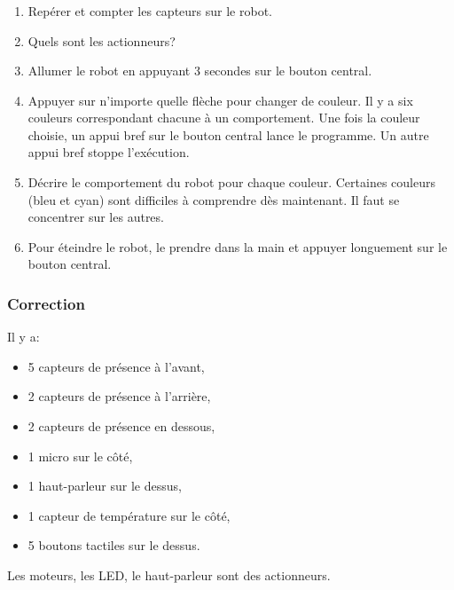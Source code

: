 \documentclass[svgnames,11pt]{beamer}
\begin{document}
\begin{frame}
    \frametitle{}

\begin{activite}
\begin{enumerate}
    \item Repérer et compter les capteurs sur le robot.
    \item Quels sont les actionneurs?
    \item Allumer le robot en appuyant 3 secondes sur le bouton central.
    \item Appuyer sur n'importe quelle flèche pour changer de couleur. Il y a six couleurs correspondant chacune à un comportement. Une fois la couleur choisie, un appui bref sur le bouton central lance le programme. Un autre appui bref stoppe l'exécution.
    \item Décrire le comportement du robot pour chaque couleur. Certaines couleurs (bleu et cyan) sont difficiles à comprendre dès maintenant. Il faut se concentrer sur les autres.
    \item Pour éteindre le robot, le prendre dans la main et appuyer longuement sur le bouton central.
\end{enumerate}
\end{activite}

\end{frame}
\begin{frame}
    \frametitle{Correction}

    Il y a:
    \begin{itemize}
        \item 5 capteurs de présence à l'avant,
        \item 2 capteurs de présence à l'arrière,
        \item 2 capteurs de présence en dessous,
        \item 1 micro sur le côté,
        \item 1 haut-parleur sur le dessus,
        \item 1 capteur de température sur le côté,
        \item 5 boutons tactiles sur le dessus.
    \end{itemize}
Les moteurs, les LED, le haut-parleur sont des actionneurs.
\end{frame}
\end{document}
